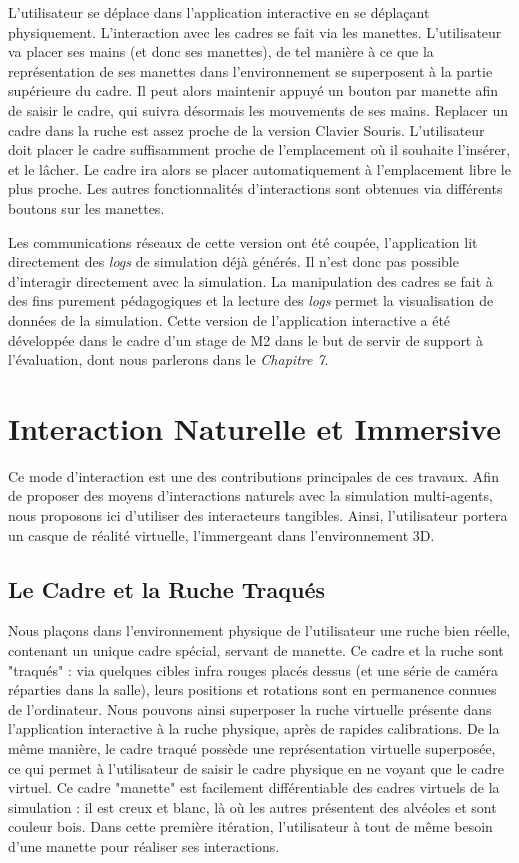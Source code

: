		 L'utilisateur se déplace dans l'application interactive en se déplaçant physiquement. L'interaction avec les cadres se fait via les manettes. L'utilisateur va placer ses mains (et donc ses manettes), de tel manière à ce que la représentation de ses manettes dans l'environnement se superposent à la partie supérieure du cadre. Il peut alors maintenir appuyé un bouton par manette afin de saisir le cadre, qui suivra désormais les mouvements de ses mains. Replacer un cadre dans la ruche est assez proche de la version Clavier Souris. L'utilisateur doit placer le cadre suffisamment proche de l'emplacement où il souhaite l'insérer, et le lâcher. Le cadre ira alors se placer automatiquement à l'emplacement libre le plus proche. Les autres fonctionnalités d'interactions sont obtenues via différents boutons sur les manettes.
		
		Les communications réseaux de cette version ont été coupée, l'application lit directement des \textit{logs} de simulation déjà générés. Il n'est donc pas possible d'interagir directement avec la simulation. La manipulation des cadres se fait à des fins purement pédagogiques et la lecture des \textit{logs} permet la visualisation de données de la simulation. Cette version de l'application interactive a été développée dans le cadre d'un stage de M2 dans le but de servir de support à l'évaluation, dont nous parlerons dans le \textit{Chapitre 7}.
		
		
	\section{Interaction Naturelle et Immersive}
	
	Ce mode d'interaction est une des contributions principales de ces travaux. Afin de proposer des moyens d'interactions naturels avec la simulation multi-agents, nous proposons ici d'utiliser des interacteurs tangibles. Ainsi, l'utilisateur portera un casque de réalité virtuelle, l'immergeant dans l'environnement 3D.

		\subsection{Le Cadre et la Ruche Traqués}
		Nous plaçons dans l'environnement physique de l'utilisateur une ruche bien réelle, contenant un unique cadre spécial, servant de manette. Ce cadre et la ruche sont "traqués" : via quelques cibles infra rouges placés dessus (et une série de caméra réparties dans la salle), leurs positions et rotations sont en permanence connues de l'ordinateur. Nous pouvons ainsi superposer la ruche virtuelle présente dans l'application interactive à la ruche physique, après de rapides calibrations. De la même manière, le cadre traqué possède une représentation virtuelle superposée, ce qui permet à l'utilisateur de saisir le cadre physique en ne voyant que le cadre virtuel. Ce cadre "manette" est facilement différentiable des cadres virtuels de la simulation : il est creux et blanc, là où les autres présentent des alvéoles et sont couleur bois. Dans cette première itération, l'utilisateur à tout de même besoin d'une manette pour réaliser ses interactions.
		
